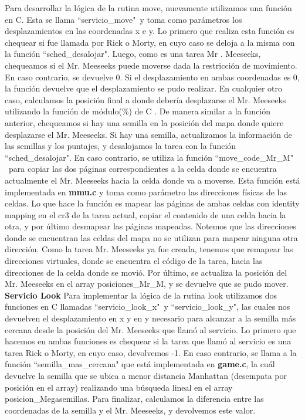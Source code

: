 \documentclass[a4paper]{article}
\begin{document}
Para desarrollar la lógica de la rutina move, nuevamente utilizamos una función en C. Esta se llama ``servicio_move"\ y toma como parámetros los desplazamientos en las coordenadas x e y. Lo primero que realiza esta función es chequear si fue llamada por Rick o Morty, en cuyo caso se deloja a la misma con la función ``sched_desalojar". Luego, como es una tarea Mr . Meeseeks, chequeamos si el Mr. Meeseeks puede moverse dada la restricción de movimiento. En caso contrario, se devuelve 0. Si el desplazamiento en ambas coordenadas es 0, la función devuelve que el desplazamiento se pudo realizar. En cualquier otro caso, calculamos la posición final a donde debería desplazarse el Mr. Meeseeks utilizando la función de módulo(\%) de C . De manera similar a la función anterior, chequeamos si hay una semilla en la posición del mapa donde quiere desplazarse el Mr. Meeseeks. Si hay una semilla, actualizamos la información de las semillas y los puntajes, y desalojamos la tarea con la función ``sched_desalojar". En caso contrario, se utiliza la función ``move_code_Mr_M" \ para copiar las dos páginas correspondientes a la celda donde se encuentra actualmente el Mr. Meeseeks hacia la celda donde va a moverse. Esta función está implementada en \textbf{mmu.c} y toma como parámetro las direcciones físicas de las celdas. Lo que hace la función es mapear las páginas de ambas celdas con identity mapping en el cr3 de la tarea actual, copiar el contenido de una celda hacia la otra, y por último desmapear las páginas mapeadas. Notemos que las direcciones donde se encuentran las celdas del mapa no se utilizan para mapear ninguna otra dirección. Como la tarea Mr. Meeseeks ya fue creada, tenemos que remapear las direcciones virtuales, donde se encuentra el código de la tarea, hacia las direcciones de la celda donde se movió. Por último, se actualiza la posición del Mr. Meeseeks en el array posiciones_Mr_M, y se devuelve que se pudo mover.
\justify
\textbf{Servicio Look}
\justify
Para implementar la lógica de la rutina look utilizamos dos funciones en C llamadas ``servicio_look_x"\ y ``servicio_look_y", las cuales nos devuelven el desplazamiento en x y en y necesario para alcanzar a la semilla más cercana desde la posición del Mr. Meeseeks que llamó al servicio. Lo primero que hacemos en ambas funciones es chequear si la tarea que llamó al servicio es una tarea Rick o Morty, en cuyo caso, devolvemos -1. En caso contrario, se llama a la función ``semilla_mas_cercana" que está implementada en \textbf{game.c}, la cuál devuelve la semilla que se ubica a menor distancia Manhattan (desempata por posición en el array) realizando una búsqueda lineal en el array posicion_Megasemillas. Para finalizar, calculamos la diferencia entre las coordenadas de la semilla y el Mr. Meeseeks, y devolvemos este valor.
\end{document}
